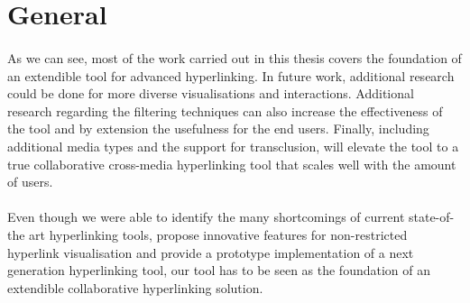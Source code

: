 \section{General} \label{sec:General}
\paragraph{}
As we can see, most of the work carried out in this thesis covers the foundation of an extendible tool for advanced hyperlinking. In future work, additional research could be done for more diverse visualisations and interactions. Additional research regarding the filtering techniques can also increase the effectiveness of the tool and by extension the usefulness for the end users. Finally, including additional media types and the support for transclusion, will elevate the tool to a true collaborative cross-media hyperlinking tool that scales well with the amount of users.
\paragraph{}
Even though we were able to identify the many shortcomings of current state-of-the art hyperlinking tools, propose innovative features for non-restricted hyperlink visualisation and provide a prototype implementation of a next generation hyperlinking tool, our tool has to be seen as the foundation of an extendible collaborative hyperlinking solution.
